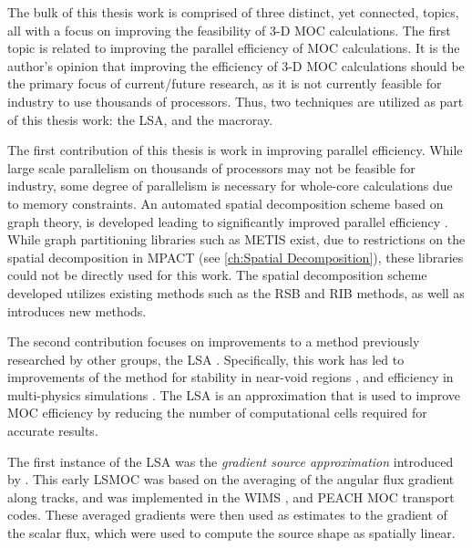 {{    The bulk of this thesis work is comprised of three distinct, yet connected, topics, all with a focus on improving the feasibility of 3-D \ac{MOC} calculations.
    The first topic is related to improving the parallel efficiency of \ac{MOC} calculations.
    It is the author's opinion that improving the efficiency of 3-D \ac{MOC} calculations should be the primary focus of current/future research, as it is not currently feasible for industry to use thousands of processors.
    Thus, two techniques are utilized as part of this thesis work: the \acf{LSA}, and the macroray.

    The first contribution of this thesis is work in improving parallel efficiency.
    While large scale parallelism on thousands of processors may not be feasible for industry, some degree of parallelism is necessary for whole-core calculations due to memory constraints.
    An automated spatial decomposition scheme based on graph theory, is developed leading to significantly improved parallel efficiency \cite{Fitzgerald2017,Fitzgerald2019a}.
    While graph partitioning libraries such as METIS \cite{METIS} exist, due to restrictions on the spatial decomposition in MPACT (see \cref{ch:Spatial Decomposition}), these libraries could not be directly used for this work.
    The spatial decomposition scheme developed utilizes existing methods such as the \acf{RSB} and \acf{RIB} methods, as well as introduces new methods.

    The second contribution focuses on improvements to a method previously researched by other groups, the \acf{LSA} \cite{Ferrer2016,Ferrer2018,Gunow2018}.
    Specifically, this work has led to improvements of the method for stability in near-void regions \cite{Fitzgerald2018}, and efficiency in multi-physics simulations \cite{Fitzgerald2019}.
    The \ac{LSA} is an approximation that is used to improve \ac{MOC} efficiency by reducing the number of computational cells required for accurate results.

    The first instance of the \ac{LSA} was the \emph{gradient source approximation} introduced by \citet{Halsall1993}.
    This early \ac{LSMOC} was based on the averaging of the angular flux gradient along tracks, and was implemented in the WIMS \cite{Halsall1993}, and PEACH \cite{Tang2009} \ac{MOC} transport codes.
    These averaged gradients were then used as estimates to the gradient of the scalar flux, which were used to compute the source shape as spatially linear.

}}
